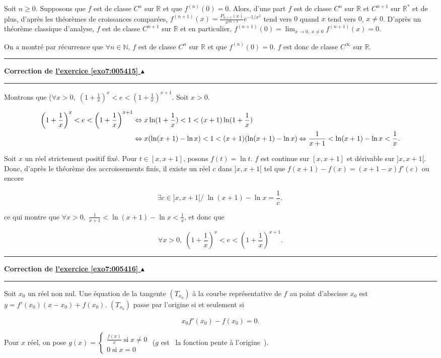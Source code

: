 \documentclass[11pt,a4paper]{article}
\newcommand{\Nn}{\mathbb{N}} \newcommand{\N}{\mathbb{N}}
\newcommand{\Rr}{\mathbb{R}} \newcommand{\R}{\mathbb{R}}
\newcounter{exo}
\newcommand{\correction}[1]{\hypertarget{cor7:#1}{}\label{cor7:#1}{\bf Correction de \hyperlink{exo7:#1}{l'exercice \ref{exo7:#1} $\blacktriangle$}}\vspace{1mm}\hrule\vspace{1mm}}
\newcommand{\fincorrection}{\vspace{1mm}\hrule\vspace*{7mm}}
\begin{document}
Soit $n\geq0$. Supposons que $f$ est de classe $C^n$ sur $\Rr$ et que $f^{(n)}(0)=0$. Alors, d'une part $f$ est de classe $C^n$ sur $\Rr$ et $C^{n+1}$ sur $\Rr^*$ et de plus, d'après les théorèmes de croissances comparées, $f^{(n+1)}(x)=\frac{P_{n+1}(x)}{x^{3n+3}}e^{-1/x^2}$ tend vers $0$ quand $x$ tend vers $0$, $x\neq 0$. D'après un théorème classique d'analyse, $f$ est de classe $C^{n+1}$ sur $\Rr$ et en particulier, $f^{(n+1)}(0)=\lim_{x\rightarrow 0,\;x\neq0}f^{(n+1)}(x)=0$.

On a montré par récurrence que $\forall n\in\Nn$, $f$ est de classe $C^n$ sur $\Rr$ et que $f^{(n)}(0)=0$. $f$ est donc de classe $C^\infty$ sur $\Rr$.
\fincorrection
\correction{005415}
Montrons que ($\forall x>0,\;\left(1+\frac{1}{x}\right)^x<e<\left(1+\frac{1}{x}\right)^{x+1}$. Soit $x>0$.

\begin{align*}\ensuremath
\left(1+\frac{1}{x}\right)^x<e<\left(1+\frac{1}{x}\right)^{x+1}
&\Leftrightarrow x\ln(1+\frac{1}{x})<1<(x+1)\ln(1+\frac{1}{x})\\
 &\Leftrightarrow x(\ln(x+1)-\ln x)<1<(x+1)(\ln(x+1)-\ln x)\Leftrightarrow\frac{1}{x+1}<\ln(x+1)-\ln x<\frac{1}{x}.
\end{align*} 

Soit $x$ un réel strictement positif fixé. Pour $t\in[x,x+1]$, posons $f(t)=\ln t$. $f$ est continue sur $[x,x+1]$ et dérivable sur $]x,x+1[$. Donc, d'après le théorème des accroissements finis, il existe un réel $c$ dans $]x,x+1[$ tel que $f(x+1)-f(x)=(x+1-x)f'(c)$ ou encore

$$\exists c\in]x,x+1[/\;\ln(x+1)-\ln x=\frac{1}{c},$$

ce qui montre que $\forall x>0,\;\frac{1}{x+1}<\ln(x+1)-\ln x<\frac{1}{x}$, et donc que 

$$\forall x>0,\;\left(1+\frac{1}{x}\right)^x<e<\left(1+\frac{1}{x}\right)^{x+1}.$$
\fincorrection
\correction{005416}



Soit $x_0$ un réel non nul. Une équation de la tangente $(T_{x_0})$ à la courbe représentative de $f$ au point d'abscisse $x_0$ est $y=f'(x_0)(x-x_0)+f(x_0)$. $(T_{x_0})$ passe par l'origine si et seulement si 

$$x_0f'(x_0)-f(x_0)=0.$$

Pour $x$ réel, on pose $g(x)=\left\{
\begin{array}{l}
\frac{f(x)}{x}\;\mbox{si}\;x\neq0\\
0\;\mbox{si}\;x=0
\end{array}
\right.$ ($g$ est \og~la fonction pente à l'origine~\fg).
\end{document}
